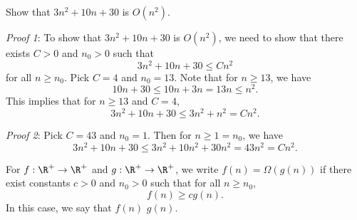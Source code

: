 \begin{flex}
\label{grp:exercise:Practice-with-big-O}

\begin{exercise}
\label{exercise:Practice-with-big-O}
Show that $3n^2 + 10n + 30$ is $O(n^2)$.

\end{exercise}

\begin{solution}
\label{sol:time-complexity::show}
\emph{Proof 1}: To show that $3n^2 + 10n + 30$ is $O(n^2)$, we need to show that there exists $C > 0$ and $n_0 > 0$ such that 
\[
3n^2 + 10n + 30 \leq Cn^2
\] 
for all $n \geq n_0$. Pick $C = 4$ and $n_0 = 13$. Note that for $n \geq 13$, we have
\[
10n + 30 \leq 10n + 3n = 13n \leq n^2.
\]
This implies that for $n \geq 13$ and $C = 4$,
\[
3n^2 + 10n + 30 \leq 3n^2 + n^2 = Cn^2. 
\]

\noindent
\emph{Proof 2}: Pick $C = 43$ and $n_0 = 1$. Then for $n \geq 1 = n_0$, we have
\[
3n^2 + 10n + 30 \leq 3n^2 + 10n^2 + 30n^2 = 43n^2 = Cn^2.
\]

\end{solution}
\end{flex}

\begin{definition}
\label{definition:Big-Omega}
For $f: \R^+ \to \R^+$ and $g: \R^+ \to \R^+$, we write $f(n) = \Omega(g(n))$ if there exist constants $c > 0$ and $n_0 > 0$ such that for all $n \geq n_0$,
\[
f(n) \geq cg(n).
\]
In this case, we say that $f(n)$  $g(n)$.

\end{definition}

